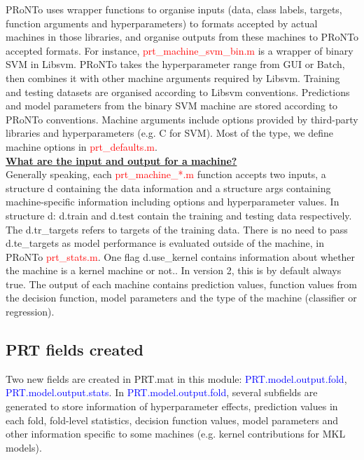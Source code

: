 PRoNTo uses wrapper functions to organise inputs (data, class labels, targets, function arguments and hyperparameters) to formats accepted by actual machines in those libraries, and organise outputs from these machines to PRoNTo accepted formats. For instance, \textcolor{red}{prt\_machine\_svm\_bin.m} is a wrapper of binary SVM in Libsvm. PRoNTo takes the hyperparameter range from GUI or Batch, then combines it with other machine arguments required by Libsvm. Training and testing datasets are organised according to Libsvm conventions. Predictions and model parameters from the binary SVM machine are stored according to PRoNTo conventions. Machine arguments include options provided by third-party libraries and hyperparameters (e.g. C for SVM). Most of the type, we define machine options in \textcolor{red}{prt\_defaults.m}.
\\
 
\noindent \textbf{\underline{What are the input and output for a machine?}}
\\

Generally speaking, each \textcolor{red}{prt\_machine\_*.m} function accepts two inputs, a structure d containing the data information and a structure args containing machine-specific information including options and hyperparameter values. In structure d: d.train and d.test contain the training and testing data respectively. The d.tr\_targets refers to targets of the training data. There is no need to pass d.te\_targets as model performance is evaluated outside of the machine, in PRoNTo \textcolor{red}{prt\_stats.m}. One flag d.use\_kernel contains information about whether the machine is a kernel machine or not.. In version 2, this is by default always true. The output of each machine contains prediction values, function values from the decision function, model parameters and the type of the machine (classifier or regression). 




\subsection{PRT fields created}

Two new fields are created in PRT.mat in this module: \textcolor{blue}{PRT.model.output.fold}, \textcolor{blue}{PRT.model.output.stats}. In \textcolor{blue}{PRT.model.output.fold}, several subfields are generated to store information of hyperparameter effects, prediction values in each fold, fold-level statistics, decision function values, model parameters and other information specific to some machines (e.g. kernel contributions for MKL models).

